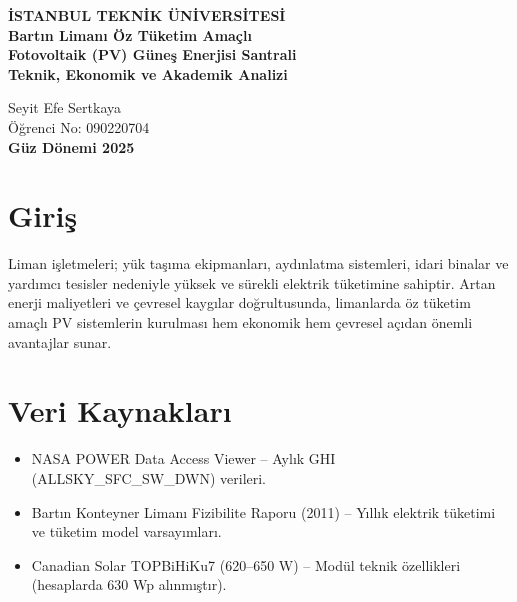\documentclass[12pt,a4paper]{article}
\begin{document}
\begin{titlepage}

\begin{center}
\textbf{İSTANBUL TEKNİK ÜNİVERSİTESİ}\\[1em]
\textbf{Bartın Limanı Öz Tüketim Amaçlı}\\
\textbf{Fotovoltaik (PV) Güneş Enerjisi Santrali}\\
\textbf{Teknik, Ekonomik ve Akademik Analizi}
\end{center}

\vfill

\begin{center}
Seyit Efe Sertkaya\\
\small Öğrenci No: 090220704\\
\textbf{Güz Dönemi 2025}
\end{center}

\end{titlepage}



\newpage
\begin{abstract}
Bu çalışmada İTÜ FIZ443 dersi bünyesinde Bartın Limanı için öz tüketim amaçlı bir fotovoltaik (PV) güneş enerjisi santralinin teknik ve ekonomik fizibilitesi incelenmiştir.
Güneş ışınım verileri NASA POWER veri tabanından alınmış, panel düzlemine gelen ışınım hesaplanmış ve yıllık enerji üretimi tahmin edilmiştir.
Kurulu güç, Bartın Limanı 2011 fizibilite raporunda verilen elektrik tüketimi esas alınarak belirlenmiştir.
Ekonomik analiz kapsamında CAPEX, OPEX, EBITDA, EBIT, NPV ve IRR ayrıntılı olarak hesaplanmıştır.
\end{abstract}

\section{Giriş}
Liman işletmeleri; yük taşıma ekipmanları, aydınlatma sistemleri, idari binalar ve yardımcı tesisler nedeniyle yüksek ve sürekli elektrik tüketimine sahiptir.
Artan enerji maliyetleri ve çevresel kaygılar doğrultusunda, limanlarda öz tüketim amaçlı PV sistemlerin kurulması hem ekonomik hem çevresel açıdan önemli avantajlar sunar.

\section{Veri Kaynakları}
\begin{itemize}
\item NASA POWER Data Access Viewer -- Aylık GHI (ALLSKY\_SFC\_SW\_DWN) verileri.
\item Bartın Konteyner Limanı Fizibilite Raporu (2011) -- Yıllık elektrik tüketimi ve tüketim model varsayımları.
\item Canadian Solar TOPBiHiKu7 (620--650 W) -- Modül teknik özellikleri (hesaplarda 630 Wp alınmıştır).
\end{itemize}
\end{document}
